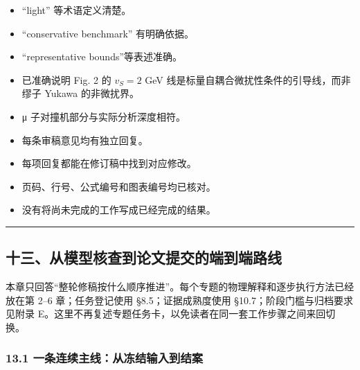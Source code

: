 \documentclass[
]{article}
\providecommand{\tightlist}{%
  \setlength{\itemsep}{0pt}\setlength{\parskip}{0pt}}
\begin{document}
\begin{itemize}
\tightlist
\item[$\square$]
  ``light'' 等术语定义清楚。
\item[$\square$]
  ``conservative benchmark'' 有明确依据。
\item[$\square$]
  ``representative bounds''等表述准确。
\item[$\square$]
  已准确说明 Fig. 2 的 \(v_S=2\) GeV
  线是标量自耦合微扰性条件的引导线，而非缪子 Yukawa 的非微扰界。
\item[$\square$]
  μ 子对撞机部分与实际分析深度相符。
\item[$\square$]
  每条审稿意见均有独立回复。
\item[$\square$]
  每项回复都能在修订稿中找到对应修改。
\item[$\square$]
  页码、行号、公式编号和图表编号均已核对。
\item[$\square$]
  没有将尚未完成的工作写成已经完成的结果。
\end{itemize}

\begin{center}\rule{0.5\linewidth}{0.5pt}\end{center}

\subsection{十三、从模型核查到论文提交的端到端路线}\label{ux5341ux4e09ux4eceux6a21ux578bux6838ux67e5ux5230ux8bbaux6587ux63d0ux4ea4ux7684ux7aefux5230ux7aefux8defux7ebf}

本章只回答``整轮修稿按什么顺序推进''。每个专题的物理解释和逐步执行方法已经放在第
2--6 章；任务登记使用 §8.5；证据成熟度使用
§10.7；阶段门槛与归档要求见附录
E。这里不再复述专题任务卡，以免读者在同一套工作步骤之间来回切换。

\subsubsection{13.1
一条连续主线：从冻结输入到结案}\label{ux4e00ux6761ux8fdeux7eedux4e3bux7ebfux4eceux51bbux7ed3ux8f93ux5165ux5230ux7ed3ux6848}
\end{document}

